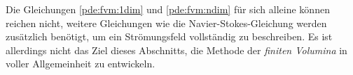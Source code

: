 Die Gleichungen \eqref{pde:fvm:1dim} und \eqref{pde:fvm:ndim} für
sich alleine können reichen nicht, weitere Gleichungen wie die
Navier-Stokes-Gleichung werden zusätzlich benötigt, um ein Strömungsfeld
vollständig zu beschreiben.
Es ist allerdings nicht das Ziel dieses Abschnitts, die Methode
der {\em finiten Volumina} in voller Allgemeinheit zu entwickeln.





